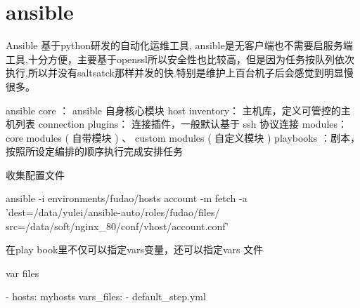 \chapter{ansible}
Ansible 基于python研发的自动化运维工具, ansible是无客户端也不需要启服务端工具,十分方便，主要基于openssl所以安全性也比较高，但是因为任务按队列依次执行,所以并没有saltsatck那样并发的快.特别是维护上百台机子后会感觉到明显慢很多。

ansible core ： ansible 自身核心模块
host inventory： 主机库，定义可管控的主机列表
connection plugins： 连接插件，一般默认基于 ssh 协议连接
modules：core modules ( 自带模块 ) 、 custom modules ( 自定义模块 )
playbooks ：剧本，按照所设定编排的顺序执行完成安排任务

收集配置文件

ansible -i environments/fudao/hosts  account -m fetch -a 'dest=/data/yulei/ansible-auto/roles/fudao/files/ src=/data/soft/nginx_80/conf/vhost/account.conf'

在play book里不仅可以指定vars变量，还可以指定vars 文件

var files

- hosts: myhosts
  vars_files:
    - default_step.yml
